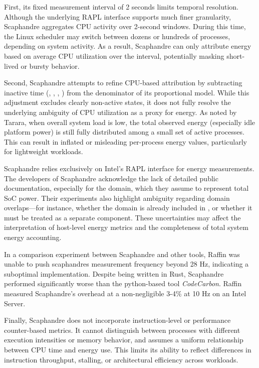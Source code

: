 First, its fixed measurement interval of 2 seconds limits temporal resolution. Although the underlying RAPL interface supports much finer granularity, Scaphandre aggregates CPU activity over 2-second windows. During this time, the Linux scheduler may switch between dozens or hundreds of processes, depending on system activity. As a result, Scaphandre can only attribute energy based on average CPU utilization over the interval, potentially masking short-lived or bursty behavior.

Second, Scaphandre attempts to refine CPU-based attribution by subtracting inactive time (, , , ) from the denominator of its proportional model. While this adjustment excludes clearly non-active states, it does not fully resolve the underlying ambiguity of CPU utilization as a proxy for energy. As noted by Tarara\parencite{Tarara2023CpuUtilization}, when overall system load is low, the total observed energy (especially idle platform power) is still fully distributed among a small set of active processes. This can result in inflated or misleading per-process energy values, particularly for lightweight workloads.

Scaphandre relies exclusively on Intel’s RAPL interface for energy measurements. The developers of Scaphandre acknowledge the lack of detailed public documentation, especially for the  domain, which they assume to represent total SoC power. Their experiments also highlight ambiguity regarding domain overlaps—for instance, whether the  domain is already included in , or whether it must be treated as a separate component. These uncertainties may affect the interpretation of host-level energy metrics and the completeness of total system energy accounting.

In a comparison experiment between Scaphandre and other tools, Raffin\parencite{raffin2024dissecting} was unable to push scaphandres measurement frequency beyond 28 Hz, indicating a suboptimal implementation. Despite being written in Rust, Scaphandre performed significantly worse than the python-based tool \textit{CodeCarbon}. Raffin measured Scaphandre's overhead at a non-negligible 3-4\% at 10 Hz on an Intel Server.

Finally, Scaphandre does not incorporate instruction-level or performance counter-based metrics. It cannot distinguish between processes with different execution intensities or memory behavior, and assumes a uniform relationship between CPU time and energy use. This limits its ability to reflect differences in instruction throughput, stalling, or architectural efficiency across workloads.


